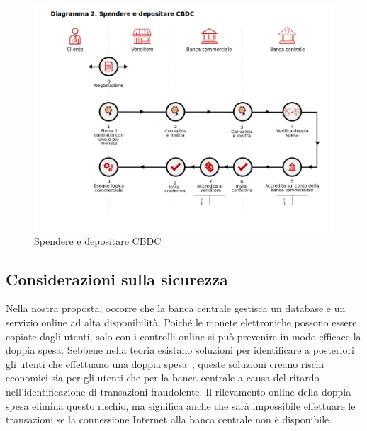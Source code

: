 \documentclass{article}
\begin{document}
\begin{figure}[h!]
  \includegraphics[width=\textwidth]{diagramma2-it.png}
  \caption{Spendere e depositare CBDC}
  \label{fig:fig2}
\end{figure}

\hypertarget{considerazioni-sulla-sicurezza}{%
\subsection{Considerazioni sulla sicurezza}
\label{considerazioni-sulla-sicurezza}}

Nella nostra proposta, occorre che la banca centrale gestisca un
database e un servizio online ad alta disponibilità. Poiché le monete
elettroniche possono essere copiate dagli utenti, solo con i controlli
online si può prevenire in modo efficace la doppia spesa. Sebbene
nella teoria esistano soluzioni per identificare a posteriori gli
utenti che effettuano una doppia spesa~\cite[vedi][]{Chaum1990},
queste soluzioni creano rischi economici sia per gli utenti che per la
banca centrale a causa del ritardo nell'identificazione di
transazioni fraudolente. Il rilevamento online della doppia spesa
elimina questo rischio, ma significa anche che sarà impossibile
effettuare le transazioni se la connessione Internet alla banca
centrale non è disponibile.
\end{document}
